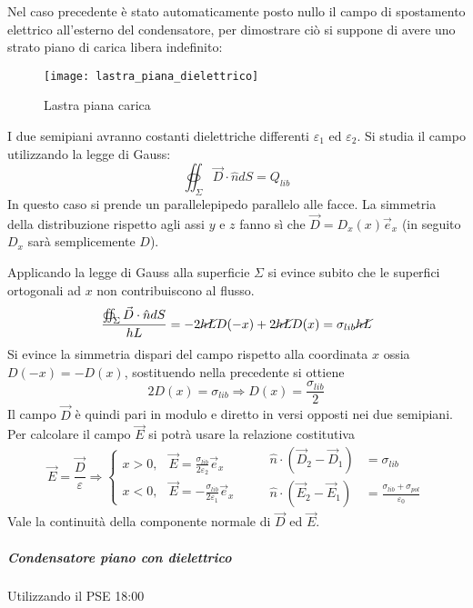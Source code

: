 Nel caso precedente è stato automaticamente posto nullo il 
campo di spostamento elettrico all'esterno del condensatore, per
dimostrare ciò si suppone di avere uno strato piano di carica libera indefinito:
\begin{figure}[H]
\centering
\texttt{[image: lastra\_piana\_dielettrico]}
\caption{Lastra piana carica}
\end{figure}
I due semipiani avranno costanti dielettriche differenti $\varepsilon_1$ 
ed $\varepsilon_2$.
Si studia il campo utilizzando la legge di Gauss:
$$
\oiint_{\Sigma} \vec{D}\cdot\hat{n}dS = Q_{lib}
$$
In questo caso si prende un parallelepipedo parallelo alle facce. La 
simmetria della distribuzione rispetto agli assi $y$ e $z$ fanno sì
che $\vec{D} = D_x(x)\vec{e}_x$ (in seguito $D_x$ sarà semplicemente $D$).

Applicando la legge di Gauss alla superficie $\Sigma$ si evince subito
che le superfici ortogonali ad $x$ non contribuiscono al flusso.
$$
\frac{\oiint_\Sigma \vec{D} \cdot \hat{n} dS }{hL}= -2\cancel{hL} D(-x) + 2\cancel{hL}D(x) = 
\sigma_{lib}\cancel{hL}
$$
Si evince la simmetria dispari del campo rispetto alla coordinata $x$ 
ossia $D(-x) = -D(x)$, sostituendo nella precedente si ottiene
$$
2D(x) = \sigma_{lib} \Rightarrow D(x) = \frac{\sigma_{lib}}{2}
$$
Il campo $\vec{D}$ è quindi pari in modulo e diretto in versi opposti
nei due semipiani. Per calcolare il campo $\vec{E}$ si potrà usare
la relazione costitutiva
$$
\vec{E} = \frac{\vec{D}}{\varepsilon}\Rightarrow
\begin{cases}
x > 0, & \vec{E}=\frac{\sigma_{lib}}{2\varepsilon_2} \vec{e}_x \\
x < 0, & \vec{E} = -\frac{\sigma_{lib}}{2\varepsilon_1} \vec{e}_x
\end{cases}\qquad
\begin{aligned}
\hat{n}\cdot(\vec{D}_2-\vec{D}_1) &= \sigma_{lib}\\
\hat{n}\cdot (\vec{E}_2-\vec{E}_1) &= \frac{\sigma_{lib}+\sigma_{pol}}{\varepsilon_0}
\end{aligned}
$$
Vale la continuità della componente normale di $\vec{D}$ ed $\vec{E}$.

\subparagraph{Condensatore piano con dielettrico}
Utilizzando il PSE
18:00




